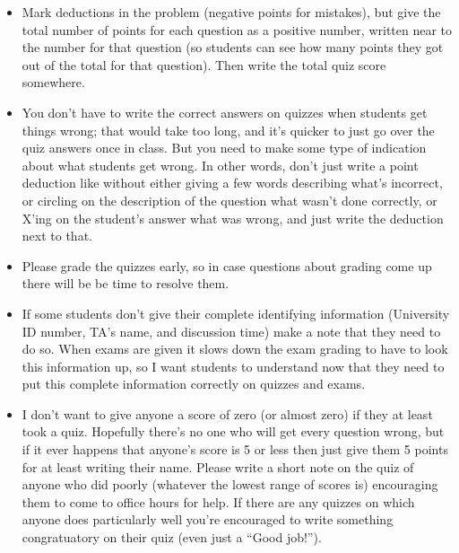 \documentclass[12pt]{article}
\begin{document}
\begin{itemize*}
\begin{itemize}
                \item Mark deductions in the problem (negative points for
                      mistakes), but give the total number of points for
                      each question as a positive number, written near to
                      the number for that question (so students can see how
                      many points they got out of the total for that
                      question).  Then write the total quiz score somewhere.

                \item You don't have to write the correct answers on quizzes
                      when students get things wrong; that would take too
                      long, and it's quicker to just go over the quiz
                      answers once in class.  But you need to make some type
                      of indication about what students get wrong.  In other
                      words, don't just write a point deduction like
                       without either giving a few words describing
                      what's incorrect, or circling on the description of
                      the question what wasn't done correctly, or X'ing on
                      the student's answer what was wrong, and just write
                      the deduction next to that.

                \item Please grade the quizzes early, so in case questions
                      about grading come up there will be be time to resolve
                      them.

                \item If some students don't give their complete identifying
                      information (University ID number, TA's name, and
                      discussion time) make a note that they need to do so.
                      When exams are given it slows down the exam grading to
                      have to look this information up, so I want students
                      to understand now that they need to put this complete
                      information correctly on quizzes and exams.

                \item I don't want to give anyone a score of zero (or almost
                      zero) if they at least took a quiz.  Hopefully there's
                      no one who will get every question wrong, but if it
                      ever happens that anyone's score is 5 or less then
                      just give them 5 points for at least writing their
                      name.  Please write a short note on the quiz of anyone
                      who did poorly (whatever the lowest range of scores
                      is) encouraging them to come to office hours for help.
                      If there are any quizzes on which anyone does
                      particularly well you're encouraged to write something
                      congratuatory on their quiz (even just a ``Good
                      job!'').


\end{itemize}
\end{itemize*}
\end{document}
